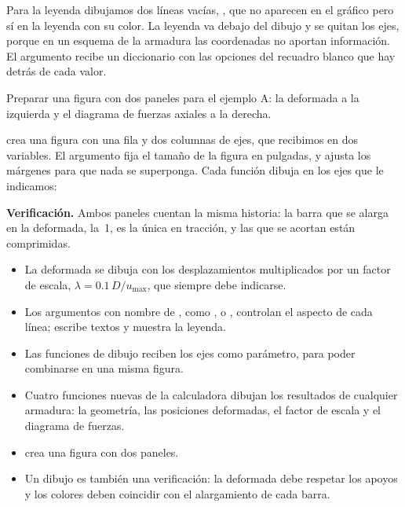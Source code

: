 Para la leyenda dibujamos dos líneas vacías, , que
no aparecen en el gráfico pero sí en la leyenda con su color. La leyenda va
debajo del dibujo y se quitan los ejes, porque en un esquema de la armadura
las coordenadas no aportan información. El argumento  recibe un
diccionario con las opciones del recuadro blanco que hay detrás de cada
valor.

\begin{problemaresuelto}
Preparar una figura con dos paneles para el ejemplo A: la deformada a la
izquierda y el diagrama de fuerzas axiales a la derecha.

\solucion
{} crea una figura con una fila y dos columnas de ejes,
que recibimos en dos variables. El argumento  fija el tamaño de
la figura en pulgadas, y  ajusta los márgenes para que
nada se superponga. Cada función dibuja en los ejes que le indicamos:

\textbf{Verificación.} Ambos paneles cuentan la misma historia: la barra que
se alarga en la deformada, la~1, es la única en tracción, y las que se
acortan están comprimidas.
\end{problemaresuelto}

\repasoyresumen

\begin{itemize}
  \item La deformada se dibuja con los desplazamientos multiplicados por un
    factor de escala, $\lambda = 0.1\,D/u_{\max}$, que siempre debe
    indicarse.
  \item Los argumentos con nombre de , como ,
     o , controlan el aspecto de cada línea;
     escribe textos y  muestra la leyenda.
  \item Las funciones de dibujo reciben los ejes  como parámetro, para
    poder combinarse en una misma figura.
  \item Cuatro funciones nuevas de la calculadora dibujan los resultados de
    cualquier armadura: la geometría, las posiciones deformadas, el factor
    de escala y el diagrama de fuerzas.
  \item {} crea una figura con dos paneles.
  \item Un dibujo es también una verificación: la deformada debe respetar los
    apoyos y los colores deben coincidir con el alargamiento de cada barra.
\end{itemize}

